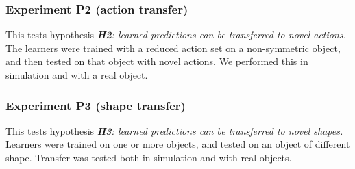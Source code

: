 \subsubsection{Experiment P2 (action transfer)} This tests hypothesis {\em {\bf H2}: learned predictions can be transferred to novel actions.} The learners were trained with a reduced action set on a non-symmetric object, and then tested on that object with novel actions. We performed this in simulation and with a real object.

\subsubsection{Experiment P3 (shape transfer)} This tests hypothesis {\em {\bf H3}: learned predictions can be transferred to novel shapes.} Learners were trained on one or more objects, and tested on an object of different shape. Transfer was tested both in simulation and with real objects.

